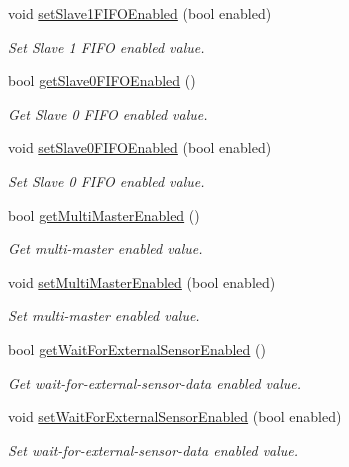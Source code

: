 \begin{DoxyCompactItemize}
void \mbox{\hyperlink{classMPU6050_a5d432fa2fb8b2227f50aa5c7b5befb66}{set\+Slave1\+F\+I\+F\+O\+Enabled}} (bool enabled)
\begin{DoxyCompactList}\small\item\em Set Slave 1 F\+I\+FO enabled value. \end{DoxyCompactList}\item 
bool \mbox{\hyperlink{classMPU6050_a6aa7aa2e3fac06f8b5ab9ee127255a5e}{get\+Slave0\+F\+I\+F\+O\+Enabled}} ()
\begin{DoxyCompactList}\small\item\em Get Slave 0 F\+I\+FO enabled value. \end{DoxyCompactList}\item 
void \mbox{\hyperlink{classMPU6050_a97fbf27e1b827f9dfc3c28ff376b54c4}{set\+Slave0\+F\+I\+F\+O\+Enabled}} (bool enabled)
\begin{DoxyCompactList}\small\item\em Set Slave 0 F\+I\+FO enabled value. \end{DoxyCompactList}\item 
bool \mbox{\hyperlink{classMPU6050_aa88483068837bd9bc9c9f6c59a7a79b7}{get\+Multi\+Master\+Enabled}} ()
\begin{DoxyCompactList}\small\item\em Get multi-\/master enabled value. \end{DoxyCompactList}\item 
void \mbox{\hyperlink{classMPU6050_a039f5724974c5bf3f373ed9be031441c}{set\+Multi\+Master\+Enabled}} (bool enabled)
\begin{DoxyCompactList}\small\item\em Set multi-\/master enabled value. \end{DoxyCompactList}\item 
bool \mbox{\hyperlink{classMPU6050_a4e2ebda47b85b4c5463f041c790bf5c0}{get\+Wait\+For\+External\+Sensor\+Enabled}} ()
\begin{DoxyCompactList}\small\item\em Get wait-\/for-\/external-\/sensor-\/data enabled value. \end{DoxyCompactList}\item 
void \mbox{\hyperlink{classMPU6050_a20dc4bdedbe1550580c28a6d090291be}{set\+Wait\+For\+External\+Sensor\+Enabled}} (bool enabled)
\begin{DoxyCompactList}\small\item\em Set wait-\/for-\/external-\/sensor-\/data enabled value. \end{DoxyCompactList}\item 

\end{DoxyCompactItemize}
